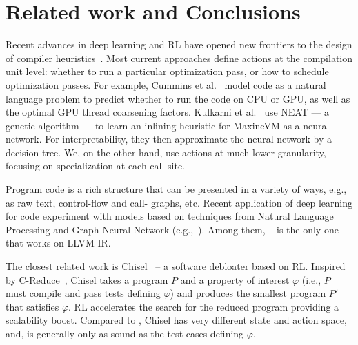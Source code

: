 \section{Related work and Conclusions}\label{sec:future}

Recent advances in deep learning and RL have opened new frontiers to the design
of compiler heuristics~\cite{autotuning}. Most current approaches define actions
at the compilation unit level: whether to run a particular optimization pass, or
how to schedule optimization passes. For example, Cummins et al.~\cite{deeptune}
model code as a natural language problem to predict whether to run the code on
CPU or GPU, as well as the optimal GPU thread coarsening factors. Kulkarni et
al.~\cite{KulkarniCWS13} use NEAT --- a genetic algorithm --- to learn an
inlining heuristic for MaxineVM as a neural network. For interpretability, they
then approximate the neural network by a decision tree. We, on the other hand,
use actions at much lower granularity, focusing on specialization at each
call-site.

Program code is a rich structure that can be presented in a variety of ways,
e.g., as raw text, control-flow and call- graphs, etc. Recent application of
deep learning for code experiment with models based on techniques from Natural
Language Processing and Graph Neural Network (e.g.,~\cite{code2vec, inst2vec,
  code2seq, code2blah}). Among them, \insttovec~\cite{inst2vec} is the only one
that works on LLVM IR. %

The closest related work is Chisel~\cite{chisel} -- a software debloater based
on RL. Inspired by C-Reduce~\cite{creduce}, Chisel takes a program $P$ and a
property of interest $\varphi$ (i.e., $P$ must compile and pass tests defining
$\varphi$) and produces the smallest program $P'$ that satisfies $\varphi$. RL
accelerates the search for the reduced program providing a scalability boost.
Compared to \doccam, Chisel has very different state and action space, and, is generally
only as sound as the test cases defining $\varphi$.
